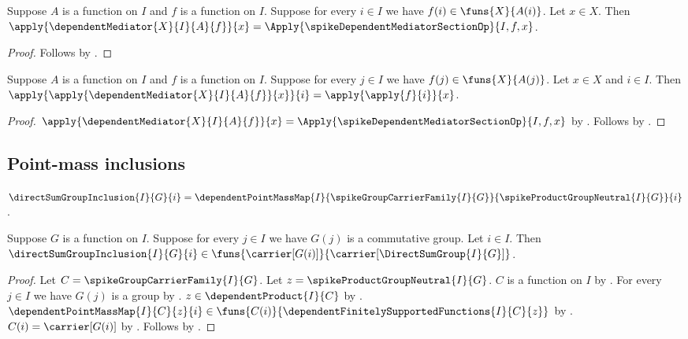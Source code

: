 \begin{proposition}\label{spike_dependent_mediator_apply}
    Suppose $A$ is a function on $I$ and $f$ is a function on $I$.
    Suppose for every $i\in I$ we have $f(i)\in\funs{X}{A(i)}$.
    Let $x\in X$.
    Then
        $\apply{\dependentMediator{X}{I}{A}{f}}{x}
            =\Apply{\spikeDependentMediatorSectionOp}{I,f,x}$.
\end{proposition}
\begin{proof}
    Follows by
        .
\end{proof}

\begin{proposition}\label{spike_dependent_mediator_coordinate}
    Suppose $A$ is a function on $I$ and $f$ is a function on $I$.
    Suppose for every $j\in I$ we have $f(j)\in\funs{X}{A(j)}$.
    Let $x\in X$ and $i\in I$.
    Then
        $\apply{\apply{\dependentMediator{X}{I}{A}{f}}{x}}{i}
            =\apply{\apply{f}{i}}{x}$.
\end{proposition}
\begin{proof}
    $\apply{\dependentMediator{X}{I}{A}{f}}{x}
        =\Apply{\spikeDependentMediatorSectionOp}{I,f,x}$ by
        .
    Follows by
        .
\end{proof}

\subsection{Point-mass inclusions}

\begin{definition}\label{spike_direct_sum_group_inclusion}
    $\directSumGroupInclusion{I}{G}{i}
        =\dependentPointMassMap
            {I}{\spikeGroupCarrierFamily{I}{G}}{
                \spikeProductGroupNeutral{I}{G}}{i}$.
\end{definition}

\begin{proposition}\label{spike_direct_sum_group_inclusion_type}
    Suppose $G$ is a function on $I$.
    Suppose for every $j\in I$ we have $G(j)$ is a commutative group.
    Let $i\in I$.
    Then
        $\directSumGroupInclusion{I}{G}{i}\in
            \funs{\carrier[G(i)]}{
                \carrier[\DirectSumGroup{I}{G}]}$.
\end{proposition}
\begin{proof}
    Let $C=\spikeGroupCarrierFamily{I}{G}$.
    Let $z=\spikeProductGroupNeutral{I}{G}$.
    $C$ is a function on $I$ by
        .
    For every $j\in I$ we have $G(j)$ is a group by
        .
    $z\in\dependentProduct{I}{C}$ by
        .
    $\dependentPointMassMap{I}{C}{z}{i}\in
        \funs{C(i)}{
            \dependentFinitelySupportedFunctions{I}{C}{z}}$ by
        .
    $C(i)=\carrier[G(i)]$ by
        .
    Follows by
        .
\end{proof}

